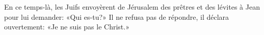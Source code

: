 En ce temps-là, les Juifs envoyèrent de Jérusalem des prêtres et des lévites
		à Jean pour lui demander:
	«Qui es-tu?»
Il ne refusa pas de répondre, il déclara ouvertement:
	«Je ne suis pas le Christ.»

